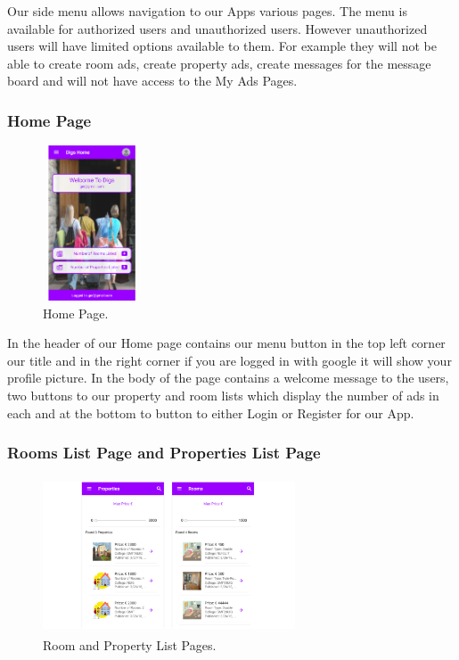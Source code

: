 \noindent Our side menu allows navigation to our Apps various pages. The menu is available for authorized users and unauthorized users. However unauthorized users will have limited options available to them. For example they will not be able to create room ads, create property ads, create messages for the message board and will not have access to the My Ads Pages.

\subsubsection{Home Page}

\begin{figure}[h]
\centering
\includegraphics[width=2.9cm, height=4.6cm]{img/Home}
\caption{Home Page.}
\end{figure}

\noindent In the header of our Home page contains our menu button in the top left corner our title and in the right corner if you are logged in with google it will show your profile picture. In the body of the page contains a welcome message to the users, two buttons to our property and room lists which display the number of ads in each and at the bottom to button to either Login or Register for our App.

\subsubsection{Rooms List Page and Properties List Page}

\begin{figure}[h]
\centering
\includegraphics[width=7.5cm, height=4.6cm]{img/adLists}
\caption{Room and Property List Pages.}
\end{figure}


